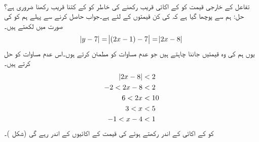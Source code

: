 \\
تفاعل  کے خارجی قیمت کو  کے  اکائی قریب رکھنے کی خاطر  کو  کے کتنا قریب رکھنا ضروری ہے؟\\
حل:\quad
ہم سے پوچھا گیا ہے کہ  کی کن قیمتوں کے لئے  ہے۔جواب حاصل کرنے سے پہلے ہم   کو  کی صورت میں لکھتے ہیں۔
\begin{align*}
\abs{y-7}=\abs{(2x-1)-7}=\abs{2x-8}
\end{align*}
یوں ہم  کی وہ قیمتیں جاننا چاہتے ہیں جو عدم مساوات  کو مطمئن کرتے ہوں۔اس عدم مساوات کو حل کرتے ہیں۔
\begin{align*}
\abs{2x-8}&<2\\
-2<2x-8&<2\\
6<2x&<10\\
3<x&<5\\
-1<x-4&<1
\end{align*}
 کو  کے  اکائی کے اندر  رکھتے ہوئے  کی قیمت  کے  اکائیوں کے اندر رہے گی (شکل )۔
